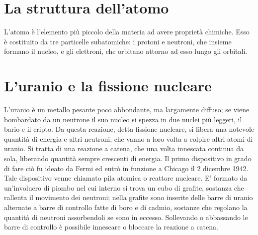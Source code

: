 \section{La struttura dell'atomo}
L'atomo  è l'elemento più piccolo della materia ad avere proprietà chimiche. Esso è costituito da tre particelle subatomiche: i protoni e neutroni, che insieme formano il nucleo, e gli elettroni, che orbitano attorno ad esso lungo gli orbitali.

\section{L'uranio e la fissione nucleare}
L'uranio è un metallo pesante poco abbondante, ma largamente diffuso; se viene bombardato da un neutrone il suo nucleo si spezza in due nuclei più leggeri, il bario e il cripto. Da questa reazione, detta fissione nucleare, si libera una notevole quantità di energia e altri neutroni, che vanno a loro volta a colpire altri atomi di uranio. Si tratta di una reazione a catena, che una volta innescata continua da sola, liberando quantità sempre crescenti di energia.
Il primo dispositivo in grado di fare ciò fu ideato da Fermi ed entrò in funzione a Chicago il 2 dicembre 1942. Tale dispositivo venne chiamato pila atomica o reattore nucleare. E' formato da un'involucro di piombo nel cui interno si trova un cubo di grafite, sostanza che rallenta il movimento dei neutroni; nella grafite sono inserite delle barre di uranio alternate a barre di controllo fatte di boro e di cadmio, sostanze che regolano la quantità di neutroni assorbendoli se sono in eccesso. Sollevando o abbassando le barre di controllo è possibile innescare o bloccare la reazione a catena.
